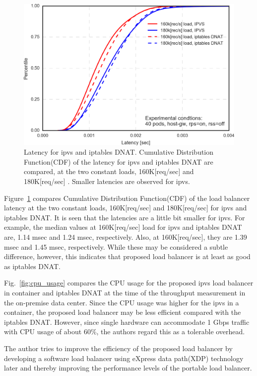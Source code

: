 \begin{figure}[h]
  \centering
  \includegraphics[width=0.75\columnwidth]{Figs/latency_cdf_rps_40pods}
  \par\bigskip
  \centering
  \begin{minipage}{0.9\columnwidth}
    \caption[Latency for ipvs and iptables DNAT]{
      Latency for ipvs and iptables DNAT.
      Cumulative Distribution Function(CDF) of the latency for ipvs and iptables DNAT are compared, at the two constant loads, 160K[req/sec] and 180K[req/sec] .
      Smaller latencies are observed for ipvs.
}
    \label{fig:latency_cdf_rps_40pods}
  \end{minipage}
\end{figure}

Figure~\ref{fig:latency_cdf_rps_40pods} compares Cumulative Distribution Function(CDF) of the load balancer latency at the two constant loads, 160K[req/sec] and 180K[req/sec] for ipvs and iptables DNAT.
It is seen that the latencies are a little bit smaller for ipvs.
For example, the median values at 160K[req/sec] load for ipvs and iptables DNAT are, 1.14 msec and 1.24 msec, respectively.
Also, at 160K[req/sec], they are 1.39 msec and 1.45 msec, respectively.
%
While these may be considered a subtle difference, however, this indicates that proposed load balancer is at least as good as iptables DNAT.

Fig.~\ref{fig:cpu_usage} compares the CPU usage for the proposed ipvs load balancer in container and iptables DNAT at the time of the throughput measurement in the on-premise data center.
Since the CPU usage was higher for the ipvs in a container, the proposed load balancer may be less efficient compared with the iptables DNAT.
However, since single hardware can accommodate 1 Gbps traffic with CPU usage of about 60\%, the authors regard this as a tolerable overhead.

The author tries to improve the efficiency of the proposed load balancer by developing a software load balancer using eXpress data path(XDP) technology\cite{hoiland2018express} later and thereby improving the performance levels of the portable load balancer.

